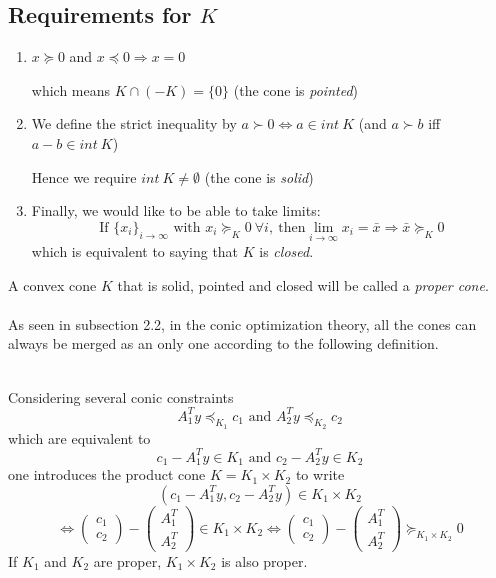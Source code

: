 \documentclass[10pt,a4paper]{article}
\begin{document}
\begin{example}
\begin{center}
\end{center}
\end{example}





\noindent \subsection{Requirements for $K$} 
\begin{enumerate}
\item $x \succeq 0$ and $x \preceq 0 \Rightarrow x = 0$

which means $K \cap (-K) = \{ 0 \}$ (the cone is \emph{pointed})

\item We define the strict inequality by $a \succ 0
\Leftrightarrow a \in int ~K$ (and $a \succ b$ iff $a-b \in int~
K$)

Hence we require $int~ K \neq \emptyset$ (the cone is
\emph{solid})

\item Finally, we would like to be able to take limits:
\[ \text{If } \{ x_i \}_{i \to \infty} \text{ with } x_i \succeq_K
0 \ \forall i,\ \text{then} \lim_{i \to \infty} x_i = \bar{x}
\Rightarrow \bar{x} \succeq_K 0 \] which is equivalent to saying
that $K$ is \emph{closed}. \end{enumerate}  

\vspace{0.25cm}

\noindent A convex cone $K$ that is solid, pointed and
closed will be called a \emph{proper cone}. \\ \\



\noindent As seen in subsection 2.2, in the conic optimization theory, all the cones can always be merged as an only one according to the following definition.
\begin{definition} \\

\noindent Considering
several conic constraints \[ A_1^T y \preceq_{K_1} c_1
\text{ and } A_2^T y \preceq_{K_2} c_2 \] which are equivalent to
\[ c_1 - A_1^T y \in K_1 \text{ and } c_2 - A_2^T y \in K_2 \] one
introduces the product cone $K = K_1 \times K_2$ to write
\[ (c_1 - A_1^T y, c_2 - A_2^T y) \in K_1 \times K_2
\] \[ \Leftrightarrow \begin{pmatrix} c_1 \\ c_2
\end{pmatrix} -
\begin{pmatrix} A_1^T \\ A_2^T \end{pmatrix} \in K_1 \times K_2
\Leftrightarrow
 \begin{pmatrix} c_1 \\ c_2 \end{pmatrix} -
\begin{pmatrix} A_1^T \\ A_2^T \end{pmatrix} \succeq_{K_1 \times K_2} 0 \]
If $K_1$ and $K_2$ are proper, $K_1 \times K_2$ is also proper.
\end{definition}
\end{document}
